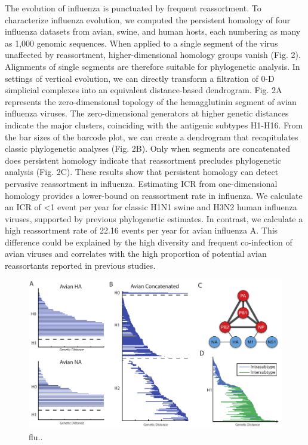 The evolution of influenza is punctuated by frequent reassortment.
To characterize influenza evolution, we computed the persistent homology of four influenza datasets from avian, swine, and human hosts, each numbering as many as 1,000 genomic sequences.
When applied to a single segment of the virus unaffected by reassortment, higher-dimensional homology groups vanish (Fig. 2).
Alignments of single segments are therefore suitable for phylogenetic analysis.
In settings of vertical evolution, we can directly transform a filtration of 0-D simplicial complexes into an equivalent distance-based dendrogram.
Fig. 2A represents the zero-dimensional topology of the hemagglutinin segment of avian influenza viruses. 
The zero-dimensional generators at higher genetic distances indicate the major clusters, coinciding with the antigenic subtypes H1-H16.
From the bar sizes of the barcode plot, we can create a dendrogram that recapitulates classic phylogenetic analyses (Fig. 2B).
Only when segments are concatenated does persistent homology indicate that reassortment precludes phylogenetic analysis (Fig. 2C).
These results show that persistent homology can detect pervasive reassortment in influenza.
Estimating ICR from one-dimensional homology provides a lower-bound on reassortment rate in influenza.
We calculate an ICR of <1 event per year for classic H1N1 swine and H3N2 human influenza viruses, supported by previous phylogenetic estimates.
In contrast, we calculate a high reassortment rate of 22.16 events per year for avian influenza A.
This difference could be explained by the high diversity and frequent co-infection of avian viruses and correlates with the high proportion of potential avian reassortants reported in previous studies.

\begin{figure}
\begin{center}
\centerline{\includegraphics[width=\columnwidth]{./fig/influenza_Fig3.pdf}}
\caption[flu...]{flu..}
\label{fig:flu_scatterplot}
\end{center}
\end{figure}

